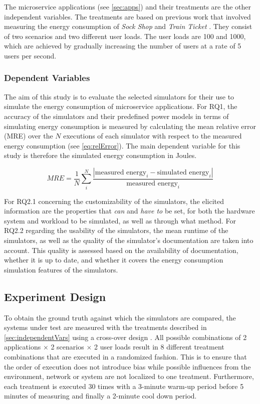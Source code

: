 The microservice applications (see \autoref{sec:apps}) and their treatments are the other independent variables. The treatments are based on previous work that involved measuring the energy consumption of \textit{Sock Shop} and \textit{Train Ticket} \cite{rodriguez_sanchez_multivariate_2024}.
They consist of two scenarios and two different user loads. The user loads are 100 and 1000, which are achieved by gradually increasing the number of users at a rate of 5 users per second.

\subsubsection{Dependent Variables}
The aim of this study is to evaluate the selected simulators for their use to simulate the  energy consumption of microservice applications. For RQ1, the accuracy of the simulators and their predefined power models in terms of simulating  energy consumption is measured by calculating the mean relative error (MRE) over the $N$ executions of each simulator with respect to the measured energy consumption (see \autoref{eq:relError}). The main dependent variable for this study is therefore the simulated  energy consumption in Joules.

\begin{equation} \label{eq:relError}
    MRE = \frac{1}{N} \sum_i^N \frac{|\text{measured energy}_i - \text{simulated energy}_i|}{\text{measured energy}_i}
\end{equation}

For RQ2.1 concerning the customizability of the simulators, the elicited information are the properties that \textit{can} and \textit{have to} be set, for both the hardware system and workload to be simulated, as well as through what method. For RQ2.2 regarding the usability of the simulators, the mean runtime of the simulators, as well as the quality of the simulator's documentation are taken into account. This quality is assessed based on the availability of documentation, whether it is up to date, and whether it covers the energy consumption simulation features of the simulators.

\subsection{Experiment Design}
To obtain the ground truth against which the simulators are compared, the systems under test are measured with the treatments described in \autoref{sec:independentVars} using a cross-over design \cite{vegas_crossover_2016}. All possible combinations of 2 applications $\times$ 2 scenarios $\times$ 2 user loads result in 8 different treatment combinations that are executed in a randomized fashion. This is to ensure that the order of execution does not introduce bias while possible influences from the environment, network or system are not localized to one treatment. Furthermore, each treatment is executed 30 times with a 3-minute warm-up period before 5 minutes of measuring and finally a 2-minute cool down period.
